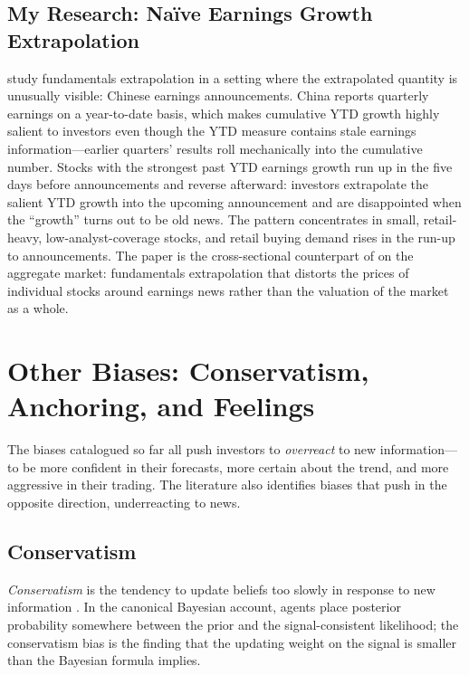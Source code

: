 \subsection{My Research: Na\"ive Earnings Growth Extrapolation}
\label{sec:myresearch_ytd}

\citet{cuizhang2021} study fundamentals extrapolation in a setting where the extrapolated quantity is unusually visible: Chinese earnings announcements. China reports quarterly earnings on a year-to-date basis, which makes cumulative YTD growth highly salient to investors even though the YTD measure contains stale earnings information---earlier quarters' results roll mechanically into the cumulative number. Stocks with the strongest past YTD earnings growth run up in the five days before announcements and reverse afterward: investors extrapolate the salient YTD growth into the upcoming announcement and are disappointed when the ``growth'' turns out to be old news. The pattern concentrates in small, retail-heavy, low-analyst-coverage stocks, and retail buying demand rises in the run-up to announcements. The paper is the cross-sectional counterpart of \citet{bordalo2023} on the aggregate market: fundamentals extrapolation that distorts the prices of individual stocks around earnings news rather than the valuation of the market as a whole.

\section{Other Biases: Conservatism, Anchoring, and Feelings}
\label{sec:otherbiases}

The biases catalogued so far all push investors to \emph{overreact} to new information---to be more confident in their forecasts, more certain about the trend, and more aggressive in their trading. The literature also identifies biases that push in the opposite direction, underreacting to news.

\subsection{Conservatism}

\begin{definition}[Conservatism]
\label{def:conservatism}
\emph{Conservatism} is the tendency to update beliefs too slowly in response to new information \citep{edwards1968}. In the canonical Bayesian account, agents place posterior probability somewhere between the prior and the signal-consistent likelihood; the conservatism bias is the finding that the updating weight on the signal is smaller than the Bayesian formula implies.
\end{definition}

